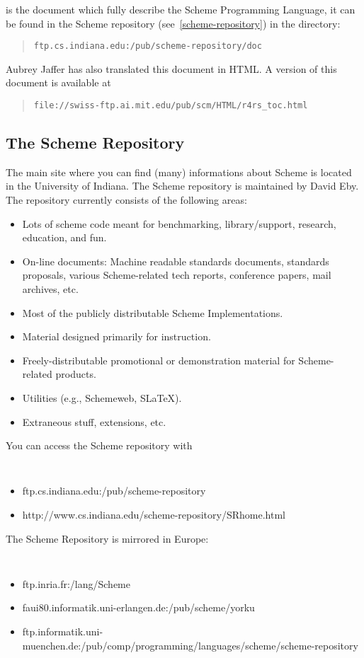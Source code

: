 {\rrrr}{} is the document which fully describe the Scheme
Programming Language, it can be found in the Scheme repository
(see~\ref{scheme-repository}) in the directory:
\begin{quote}
{\tt ftp.cs.indiana.edu:/pub/scheme-repository/doc}
\end{quote}

Aubrey Jaffer has also translated this document in HTML. A version of this 
document is available at
\begin{quote}
{\tt file://swiss-ftp.ai.mit.edu/pub/scm/HTML/r4rs\_toc.html}
\end{quote}

\subsection{The Scheme Repository}

The main site where you can find (many) informations about Scheme is
located in the University of Indiana. The Scheme repository is maintained by David Eby.  The repository currently consists
of the following areas:
\begin{itemize}
\item      Lots of scheme code meant for benchmarking, library/support, research, education, and fun. 
\item      On-line documents: Machine readable standards documents, standards proposals, various Scheme-related tech reports, conference papers, mail archives, etc. 
\item      Most of the publicly distributable Scheme Implementations. 
\item    Material designed primarily for instruction. 
\item Freely-distributable promotional or demonstration material for Scheme-related products. 
\item   Utilities (e.g., Schemeweb, SLaTeX). 
\item   Extraneous stuff, extensions, etc. 
\end{itemize}

You can access the Scheme repository with
{\tt
\begin{itemize}
\item ftp.cs.indiana.edu:/pub/scheme-repository
\item http://www.cs.indiana.edu/scheme-repository/SRhome.html
\end{itemize}
}

The Scheme Repository is mirrored in Europe: 
{\tt
\begin{itemize}
\item     ftp.inria.fr:/lang/Scheme
\item     faui80.informatik.uni-erlangen.de:/pub/scheme/yorku
\item     ftp.informatik.uni-muenchen.de:/pub/comp/programming/languages/scheme/scheme-repository
\end{itemize}
}
